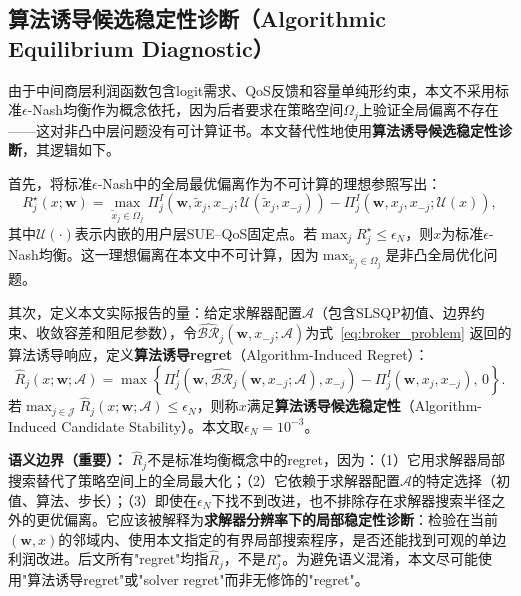 \documentclass[UTF8,11pt]{ctexart}
\newcommand{\J}{\mathcal{J}}
\newcommand{\w}{\boldsymbol{w}}
\begin{document}
\subsection{算法诱导候选稳定性诊断（Algorithmic Equilibrium Diagnostic）}
\label{sec:regret_definition}

由于中间商层利润函数包含logit需求、QoS反馈和容量单纯形约束，本文不采用标准$\epsilon$-Nash均衡作为概念依托，因为后者要求在策略空间$\Omega_j$上验证全局偏离不存在——这对非凸中层问题没有可计算证书。本文替代性地使用\textbf{算法诱导候选稳定性诊断}，其逻辑如下。

首先，将标准$\epsilon$-Nash中的全局最优偏离作为不可计算的理想参照写出：
\begin{equation}
  R^{\star}_j(x;\w)=
  \max_{\tilde x_j\in\Omega_j}
  \Pi^I_j(\w,\tilde x_j,x_{-j};\mathcal{U}(\tilde x_j,x_{-j}))
  -\Pi^I_j(\w,x_j,x_{-j};\mathcal{U}(x)),
  \label{eq:ideal_regret_reference}
\end{equation}
其中$\mathcal{U}(\cdot)$表示内嵌的用户层SUE--QoS固定点。若$\max_j R^{\star}_j\le\epsilon_N$，则$x$为标准$\epsilon$-Nash均衡。这一理想偏离在本文中不可计算，因为$\max_{\tilde x_j\in\Omega_j}$是非凸全局优化问题。

其次，定义本文实际报告的量：给定求解器配置$\mathcal{A}$（包含SLSQP初值、边界约束、收敛容差和阻尼参数），令$\widehat{\mathcal{BR}}_j(\w,x_{-j};\mathcal{A})$为式~\eqref{eq:broker_problem} 返回的算法诱导响应，定义\textbf{算法诱导regret}（Algorithm-Induced Regret）：
\begin{equation}
  \widehat R_j(x;\w;\mathcal{A})=
  \max\left\{
  \Pi^I_j(\w,\widehat{\mathcal{BR}}_j(\w,x_{-j};\mathcal{A}),x_{-j})
  -\Pi^I_j(\w,x_j,x_{-j}),\,0
  \right\}.
  \label{eq:solver_regret_diagnostic}
\end{equation}
若$\max_{j\in\J}\widehat R_j(x;\w;\mathcal{A})\le \epsilon_N$，则称$x$满足\textbf{算法诱导候选稳定性}（Algorithm-Induced Candidate Stability）。本文取$\epsilon_N=10^{-3}$。

\textbf{语义边界（重要）：} $\widehat R_j$不是标准均衡概念中的regret，因为：（1）它用求解器局部搜索替代了策略空间上的全局最大化；（2）它依赖于求解器配置$\mathcal{A}$的特定选择（初值、算法、步长）；（3）即使在$\epsilon_N$下找不到改进，也不排除存在求解器搜索半径之外的更优偏离。它应该被解释为\textbf{求解器分辨率下的局部稳定性诊断}：检验在当前$(\w,x)$的邻域内、使用本文指定的有界局部搜索程序，是否还能找到可观的单边利润改进。后文所有"regret"均指$\widehat R_j$，不是$R^{\star}_j$。为避免语义混淆，本文尽可能使用"算法诱导regret"或"solver regret"而非无修饰的"regret"。
\end{document}
